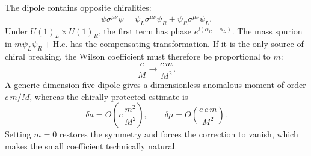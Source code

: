 \begin{enumerate}
The dipole contains opposite chiralities:
\[
 \bar\psi\sigma^{\mu\nu}\psi
 =\bar\psi_L\sigma^{\mu\nu}\psi_R
 +\bar\psi_R\sigma^{\mu\nu}\psi_L.
\]
Under \(U(1)_L\times U(1)_R\), the first term has phase
\(e^{\ii(\alpha_R-\alpha_L)}\).  The mass spurion in
\(m\bar\psi_L\psi_R+\mathrm{H.c.}\) has the compensating transformation.
If it is the only source of chiral breaking, the Wilson coefficient must
therefore be proportional to \(m\):
\[
 \frac{c}{M}\longrightarrow \frac{c\,m}{M^2}.
\]
A generic dimension-five dipole gives a dimensionless anomalous moment of
order \(c\,m/M\), whereas the chirally protected estimate is
\[
 \delta a=O\left(c\,\frac{m^2}{M^2}\right),\qquad
 \delta\mu=O\left(\frac{e\,c\,m}{M^2}\right).
\]
Setting \(m=0\) restores the symmetry and forces the correction to vanish,
which makes the small coefficient technically natural.


\end{enumerate}
